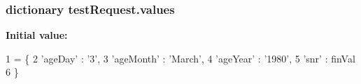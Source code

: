\hypertarget{namespacetest_request_ad045126755bc1baa0a4cacb58d77b4a1}{
\subsubsection[{values}]{\setlength{\rightskip}{0pt plus 5cm}dictionary test\+Request.\+values}}\label{namespacetest_request_ad045126755bc1baa0a4cacb58d77b4a1}
{\bfseries Initial value\+:}
\begin{DoxyCode}
1 = \{
2         \textcolor{stringliteral}{'ageDay'} : \textcolor{stringliteral}{'3'},
3         \textcolor{stringliteral}{'ageMonth'} : \textcolor{stringliteral}{'March'},
4         \textcolor{stringliteral}{'ageYear'} : \textcolor{stringliteral}{'1980'},
5         \textcolor{stringliteral}{'snr'} : finVal
6     \}
\end{DoxyCode}
